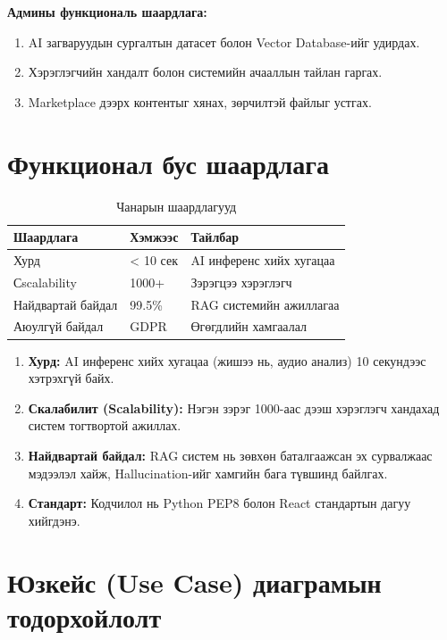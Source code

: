 \textbf{Админы функциональ шаардлага:}
\begin{enumerate}
    \item AI загваруудын сургалтын датасет болон Vector Database-ийг удирдах.
    \item Хэрэглэгчийн хандалт болон системийн ачааллын тайлан гаргах.
    \item Marketplace дээрх контентыг хянах, зөрчилтэй файлыг устгах.
\end{enumerate}

\section{Функционал бус шаардлага}

\begin{table}[htbp]
\centering
\caption{Чанарын шаардлагууд}
\label{tab:QualityRequirements}
\begin{tabular}{|l|p{3cm}|p{7cm}|}
\hline
\textbf{Шаардлага} & \textbf{Хэмжээс} & \textbf{Тайлбар} \\
\hline
Хурд & < 10 сек & AI инференс хийх хугацаа \\
\hline
Сscalability & 1000+ & Зэрэгцээ хэрэглэгч \\
\hline
Найдвартай байдал & 99.5\% & RAG системийн ажиллагаа \\
\hline
Аюулгүй байдал & GDPR & Өгөгдлийн хамгаалал \\
\hline
\end{tabular}
\end{table}

\begin{enumerate}
    \item \textbf{Хурд:} AI инференс хийх хугацаа (жишээ нь, аудио анализ) 10 секундээс хэтрэхгүй байх.
    \item \textbf{Скалабилит (Scalability):} Нэгэн зэрэг 1000-аас дээш хэрэглэгч хандахад систем тогтвортой ажиллах.
    \item \textbf{Найдвартай байдал:} RAG систем нь зөвхөн баталгаажсан эх сурвалжаас мэдээлэл хайж, Hallucination-ийг хамгийн бага түвшинд байлгах.
    \item \textbf{Стандарт:} Кодчилол нь Python PEP8 болон React стандартын дагуу хийгдэнэ.
\end{enumerate}

\section{Юзкейс (Use Case) диаграмын тодорхойлолт}

